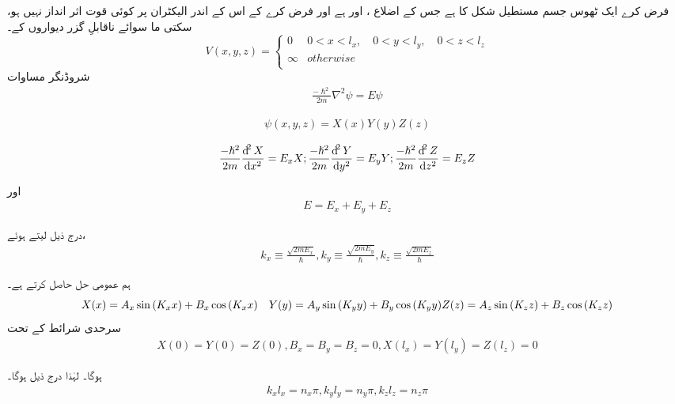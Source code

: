 ،فرض کرے ایک ٹھوس جسم مستطیل شکل کا ہے جس کے اضلاع     ،     اور       ہے  اور فرض کرے کے اس کے اندر الیکٹران پر کوئی قوت اثر انداز نہیں ہو سکتی ما سوائے ناقابلِ گزر دیواروں کے۔
\begin{equation}
V(x,y,z)=
\begin{cases}
0 & 0<x<l_{x}, \quad 0<y<l_{y}, \quad 0<z<l_{z}\\
\infty & otherwise\\
\end{cases}
\end{equation}
شروڈنگر مساوات
 \begin{align}
\frac{-\hslash^{2}}{2m}\nabla^{2}\psi=E\psi\end{align}

 \begin{align}
\psi(x,y,z)=X(x)Y(y)Z(z)\end{align}

 \begin{align}
\frac{-\hslash^{2}}{2m}\frac{\dif^{2}X}{\dif{x}^{2}}=E_{x}X ; \frac{-\hslash^{2}}{2m}\frac{\dif^{2}Y}{\dif{y}^{2}}=E_{y}Y ; \frac{-\hslash^{2}}{2m}\frac{\dif^{2}Z}{\dif{z}^{2}}=E_{z}Z\end{align}

اور
 \begin{align}
E=E_{x}+E_{y}+E_{z}\end{align}

درج ذیل لیتے ہوئے،
 \begin{align}
k_{x}\equiv \frac{\sqrt{2mE_{x}}}{\hslash}, k_{y}\equiv\frac{\sqrt{2mE_{y}}}{\hslash}, k_{z}\equiv \frac{\sqrt{2mE_{z}}}{\hslash}\end{align}

 ہم عمومی حل حاصل کرتے ہے۔
\begin{equation}
X(x)=A_{x}\sin{(K_{x}x)}+B_{x}\cos{(K_{x}x)} \quad Y(y)=A_{y}\sin{(K_{y}y)}+B_{y}\cos{(K_{y}y)}\\
Z(z)=A_{z}\sin{(K_{z}z)}+B_{z}\cos{(K_{z}z)}\\
\end{equation}
سرحدی شرائط کے تحت
 \begin{align}
X(0)=Y(0)=Z(0), B_{x}=B_{y}=B_{z}=0, X(l_{x})=Y(l_{y})=Z(l_{z})=0\end{align}

ہوگا۔ لہٰذا درج ذیل ہوگا۔
 \begin{align}
k_{x}l_{x}=n_{x}\pi, k_{y}l_{y}=n_{y}\pi, k_{z}l_{z}=n_{z}\pi\end{align}

